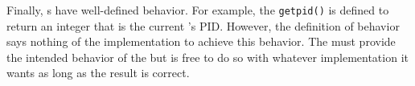 Finally, s have well-defined behavior.
For example, the  \texttt{getpid()} is defined to return an integer that is the current ’s PID.\@
However, the definition of behavior says nothing of the implementation to achieve this behavior.
The  must provide the intended behavior of the  but is free to do so with whatever implementation it wants as long as the result is correct.












